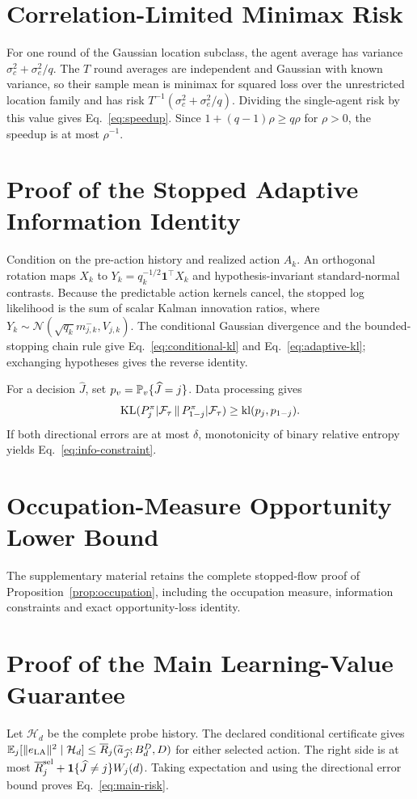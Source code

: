 \section{Correlation-Limited Minimax Risk}
For one round of the Gaussian location subclass, the agent average has variance $\sigma_c^2+\sigma_e^2/q$.
The $T$ round averages are independent and Gaussian with known variance, so their sample mean is minimax for squared loss over the unrestricted location family and has risk $T^{-1}(\sigma_c^2+\sigma_e^2/q)$.
Dividing the single-agent risk by this value gives Eq.~\eqref{eq:speedup}.
Since $1+(q-1)\rho\ge q\rho$ for $\rho>0$, the speedup is at most $\rho^{-1}$.

\section{Proof of the Stopped Adaptive Information Identity}
\label{app:information}
Condition on the pre-action history and realized action $A_k$.
An orthogonal rotation maps $X_k$ to $Y_k=q_k^{-1/2}\bm{1}^\top X_k$ and hypothesis-invariant standard-normal contrasts.
Because the predictable action kernels cancel, the stopped log likelihood is the sum of scalar Kalman innovation ratios, where $Y_k\sim\mathcal N(\sqrt{q_k}m^-_{j,k},V_{j,k})$.
The conditional Gaussian divergence and the bounded-stopping chain rule give Eq.~\eqref{eq:conditional-kl} and Eq.~\eqref{eq:adaptive-kl}; exchanging hypotheses gives the reverse identity.

For a decision $\widehat J$, set $p_v=\mathbb{P}_v\{\widehat J=j\}$.
Data processing gives
\begin{equation}
\operatorname{KL}(P_j^\pi|\mathcal{F}_\tau\,\|\,P_{1-j}^\pi|\mathcal{F}_\tau)\ge\operatorname{kl}(p_j,p_{1-j}).
\end{equation}
If both directional errors are at most $\delta$, monotonicity of binary relative entropy yields Eq.~\eqref{eq:info-constraint}.

\section{Occupation-Measure Opportunity Lower Bound}
\label{app:occupation}
The supplementary material retains the complete stopped-flow proof of Proposition~\ref{prop:occupation}, including the occupation measure, information constraints and exact opportunity-loss identity.

\section{Proof of the Main Learning-Value Guarantee}
\label{app:main}
Let $\mathcal H_d$ be the complete probe history.
The declared conditional certificate gives $\mathbb{E}_j[\|e_{\rm LA}\|^2\mid\mathcal H_d]\le\overline R_j(\widetilde a_{\widehat J};B_d^D,D)$ for either selected action.
The right side is at most $\overline R_j^{\rm sel}+\mathbf1\{\widehat J\ne j\}W_j(d)$.
Taking expectation and using the directional error bound proves Eq.~\eqref{eq:main-risk}.


